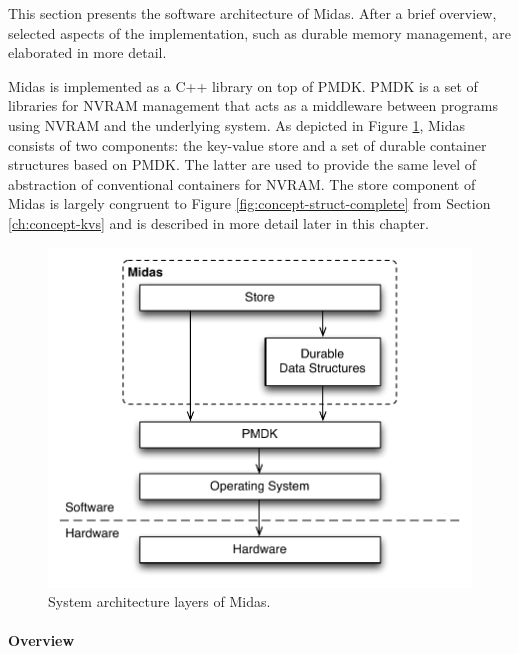 
This section presents the software architecture of Midas. After a brief
overview, selected aspects of the implementation, such as durable memory
management, are elaborated in more detail.

Midas is implemented as a C++ library on top of PMDK. PMDK is a set of libraries
for NVRAM management that acts as a middleware between programs using NVRAM and
the underlying system. As depicted in Figure \ref{fig:impl-arch}, Midas consists
of two components: the key-value store and a set of durable container structures
based on PMDK. The latter are used to provide the same level of abstraction of
conventional containers for NVRAM. The store component of Midas is largely
congruent to Figure \ref{fig:concept-struct-complete} from Section
\ref{ch:concept-kvs} and is described in more detail later in this chapter.

\begin{figure}[h!]
    \centering
    \includegraphics[scale=0.75]{figures/impl/arch2.pdf}
    \caption{System architecture layers of Midas.}
    \label{fig:impl-arch}
\end{figure}

\paragraph{Overview}

